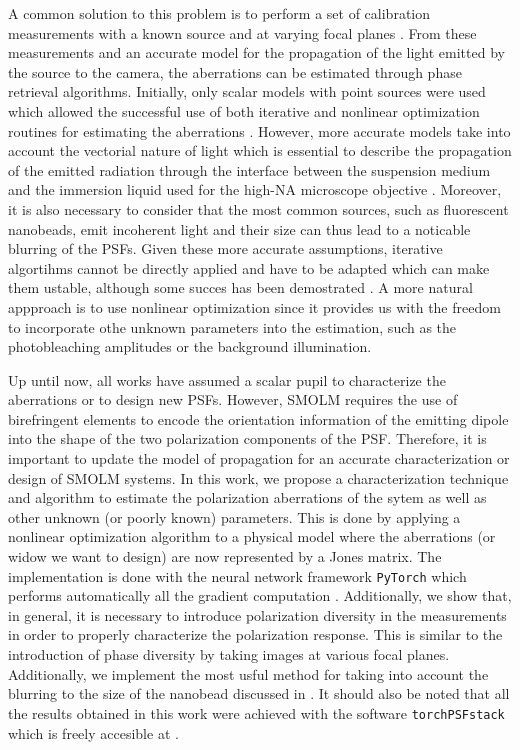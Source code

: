 \documentclass[reprint,aps,pra,superscriptaddress,
amsmath,amssymb]{revtex4-1}
\begin{document}
A common solution to this problem is to perform a set of calibration 
measurements with a known source and at varying focal planes 
\cite{hanser2003phase,hanser2004phase}. From 
these measurements and an accurate model for the propagation of the light
emitted by the source to the camera, the aberrations can be estimated 
through phase retrieval algorithms. Initially, only scalar models with point 
sources were used which allowed the successful use of both iterative and 
nonlinear optimization routines for estimating the aberrations 
\cite{hanser2003phase,hanser2004phase,clark2012microscope}. However, 
more accurate models \cite{thao2019phase,ferdman2020vipr} take into 
account the vectorial nature of light which is essential to describe 
the propagation of the emitted radiation through the 
interface between the suspension medium and the immersion liquid used for 
the high-NA microscope objective \cite{novotny2006principles}. Moreover,
it is also necessary to consider that the most common sources, 
such as fluorescent nanobeads, emit 
incoherent light and their size can thus lead to a noticable blurring of 
the PSFs.
Given these more accurate assumptions, 
iterative algortihms cannot be directly applied and have to be adapted which 
can make them ustable, although some succes has been demostrated 
\cite{thao2019phase}. A more natural appproach is to use nonlinear optimization
\cite{fienup1982phase,ferdman2020vipr}
since it provides us with the freedom to incorporate othe unknown parameters
into the estimation, such as the photobleaching amplitudes or the background 
illumination.

Up until now, all works have assumed a scalar pupil to characterize 
the aberrations or to design new PSFs. However, SMOLM requires the use 
of birefringent elements to encode the orientation information of the 
emitting dipole
into the shape of the two polarization components of the PSF. 
Therefore, it is important to update the model of propagation for an accurate
characterization or design of SMOLM systems. In this work, we propose a 
characterization technique and algorithm to estimate the polarization aberrations 
of the sytem \cite{hansen1988overcoming} as well as other unknown (or poorly known) parameters. 
This is done by applying a nonlinear optimization algorithm to a physical model
where the aberrations (or widow we want to design) are now represented by a Jones
matrix. The implementation is done with the 
neural network framework \texttt{PyTorch} \cite{} which performs automatically
all the gradient computation \cite{}. Additionally, we show that, in general,
it is necessary to introduce polarization diversity in the measurements 
in order to properly characterize the polarization response. This is similar 
to the introduction of phase diversity by taking images at various focal planes.
Additionally, we implement the most usful method for taking into account the 
blurring to the size of the nanobead discussed in \cite{}.
It should also be noted that all the results obtained in this work 
were achieved with the software \texttt{torchPSFstack} which is freely 
accesible at \cite{}.
\end{document}
